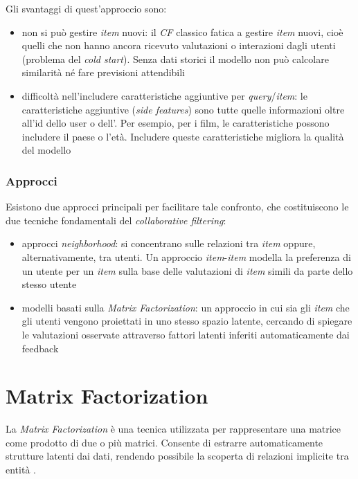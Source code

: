 Gli svantaggi di quest'approccio sono:

\begin{itemize}
  \item non si può gestire \textit{item} nuovi: il \textit{CF} classico fatica a gestire \textit{item} nuovi, cioè quelli che non hanno ancora ricevuto valutazioni o interazioni dagli utenti (problema del \textit{cold start}). Senza dati storici il modello non può calcolare similarità né fare previsioni attendibili
  \item difficoltà nell'includere caratteristiche aggiuntive per \textit{query}/\textit{item}: le caratteristiche aggiuntive (\textit{side features}) sono tutte quelle informazioni oltre all'id dello user o dell'. Per esempio, per i film, le caratteristiche possono includere il paese o l'età. Includere queste caratteristiche migliora la qualità del modello
\end{itemize}

\subsubsection{Approcci}

Esistono due approcci principali per facilitare tale confronto, che costituiscono le due tecniche fondamentali del \textit{collaborative filtering}: 

\begin{itemize}
    \item approcci \textit{neighborhood}: si concentrano sulle relazioni tra \textit{item} oppure, alternativamente, tra utenti. Un approccio \textit{item}-\textit{item} modella la preferenza di un utente per un \textit{item} sulla base delle valutazioni di \textit{item} simili da parte dello stesso utente
    \item modelli basati sulla \textit{Matrix Factorization}: un approccio in cui sia gli \textit{item} che gli utenti vengono proiettati in uno stesso spazio latente, cercando di spiegare le valutazioni osservate attraverso fattori latenti inferiti automaticamente dai feedback
\end{itemize}

\section{Matrix Factorization}\label{matrix_factorization}

La \textit{Matrix Factorization} è una tecnica utilizzata per rappresentare una matrice come prodotto di due o più matrici. Consente di estrarre automaticamente strutture latenti dai dati, rendendo possibile la scoperta di relazioni implicite tra entità \cite{MC}.

